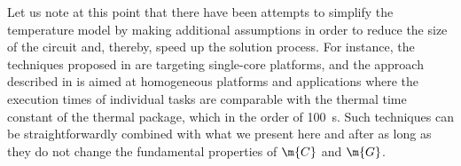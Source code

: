 Let us note at this point that there have been attempts to simplify the
temperature model by making additional assumptions in order to reduce the size
of the circuit and, thereby, speed up the solution process. For instance, the
techniques proposed in \cite{bao2010, rai2011} are targeting single-core
platforms, and the approach described in \cite{rao2009} is aimed at homogeneous
platforms and applications where the execution times of individual tasks are
comparable with the thermal time constant of the thermal package, which in the
order of 100~s. Such techniques can be straightforwardly combined with what we
present here and after as long as they do not change the fundamental properties
of $\m{C}$ and $\m{G}$.
